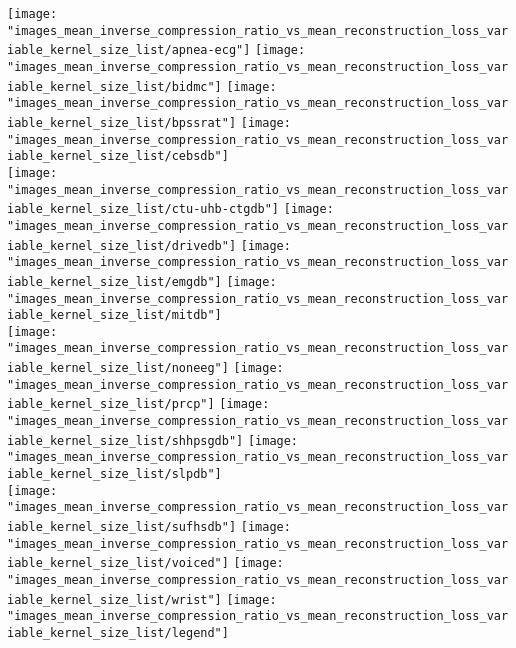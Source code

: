 \texttt{[image: "images\_mean\_inverse\_compression\_ratio\_vs\_mean\_reconstruction\_loss\_variable\_kernel\_size\_list/apnea-ecg"]}
\texttt{[image: "images\_mean\_inverse\_compression\_ratio\_vs\_mean\_reconstruction\_loss\_variable\_kernel\_size\_list/bidmc"]}
\texttt{[image: "images\_mean\_inverse\_compression\_ratio\_vs\_mean\_reconstruction\_loss\_variable\_kernel\_size\_list/bpssrat"]}
\texttt{[image: "images\_mean\_inverse\_compression\_ratio\_vs\_mean\_reconstruction\_loss\_variable\_kernel\_size\_list/cebsdb"]}
\\
		\texttt{[image: "images\_mean\_inverse\_compression\_ratio\_vs\_mean\_reconstruction\_loss\_variable\_kernel\_size\_list/ctu-uhb-ctgdb"]}
		\texttt{[image: "images\_mean\_inverse\_compression\_ratio\_vs\_mean\_reconstruction\_loss\_variable\_kernel\_size\_list/drivedb"]}
		\texttt{[image: "images\_mean\_inverse\_compression\_ratio\_vs\_mean\_reconstruction\_loss\_variable\_kernel\_size\_list/emgdb"]}
		\texttt{[image: "images\_mean\_inverse\_compression\_ratio\_vs\_mean\_reconstruction\_loss\_variable\_kernel\_size\_list/mitdb"]}
		\\
			\texttt{[image: "images\_mean\_inverse\_compression\_ratio\_vs\_mean\_reconstruction\_loss\_variable\_kernel\_size\_list/noneeg"]}
			\texttt{[image: "images\_mean\_inverse\_compression\_ratio\_vs\_mean\_reconstruction\_loss\_variable\_kernel\_size\_list/prcp"]}
			\texttt{[image: "images\_mean\_inverse\_compression\_ratio\_vs\_mean\_reconstruction\_loss\_variable\_kernel\_size\_list/shhpsgdb"]}
			\texttt{[image: "images\_mean\_inverse\_compression\_ratio\_vs\_mean\_reconstruction\_loss\_variable\_kernel\_size\_list/slpdb"]}
			\\
				\texttt{[image: "images\_mean\_inverse\_compression\_ratio\_vs\_mean\_reconstruction\_loss\_variable\_kernel\_size\_list/sufhsdb"]}
				\texttt{[image: "images\_mean\_inverse\_compression\_ratio\_vs\_mean\_reconstruction\_loss\_variable\_kernel\_size\_list/voiced"]}
				\texttt{[image: "images\_mean\_inverse\_compression\_ratio\_vs\_mean\_reconstruction\_loss\_variable\_kernel\_size\_list/wrist"]}
				\texttt{[image: "images\_mean\_inverse\_compression\_ratio\_vs\_mean\_reconstruction\_loss\_variable\_kernel\_size\_list/legend"]}

